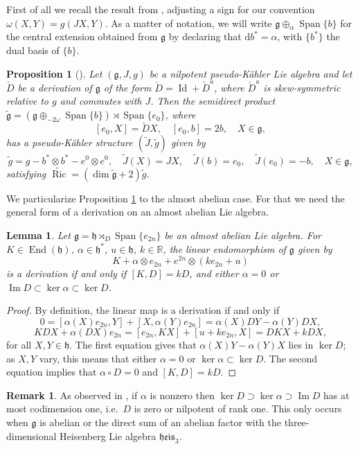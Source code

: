 \documentclass{article}
\newtheorem{proposition}[theorem]{Proposition}
\newtheorem{lemma}[theorem]{Lemma}
\theoremstyle{definition}
\newtheorem{remark}[theorem]{Remark}
\DeclareMathOperator{\Id}{Id}
\DeclareMathOperator{\End}{End}
\DeclareMathOperator{\Ric}{Ric}
\newcommand{\R}{\mathbb{R}}
\newcommand{\frg}{\mathfrak{g}}
\newcommand{\frh}{\mathfrak{h}}
\renewcommand{\Im}{\operatorname{Im}}
\renewcommand{\d}{\mathrm{d}}
\newcommand{\Span}[1]{\operatorname{Span}\{#1\}}
\newcommand{\lie}[1]{\mathfrak{#1}}
\DeclareMathOperator{\im}{Im}
\newcommand{\g}{\lie g}
\begin{document}
First of all we recall the result from \cite{Conti_Rossi_SegnanDalmasso_2023}, adjusting a sign for our convention $\omega(X,Y)=g(JX,Y)$. As a matter of notation, we will write $\g\oplus_{\alpha}\Span{b}$ for the central extension obtained from $\g$ by declaring that $\d b^*=\alpha$, with $\{b^*\}$ the dual basis of $\{b\}$.

\begin{proposition}[{\cite[Corollary 3.6]{Conti_Rossi_SegnanDalmasso_2023}}]\label{prop:constructse}
    Let $(\frg,J,g)$ be a nilpotent pseudo-Kähler Lie algebra and let $\check{D}$ be a derivation of $\frg$ of the form $\check{D}=\Id+\check{D}^a$, where $\check{D}^a$ is skew-symmetric relative to $g$ and commutes with $J$. Then the semidirect product $\tilde{\frg}=(\frg\oplus_{-2\omega}\Span{b})\rtimes\Span{e_0}$, where $$[e_0,X]=\check{D}X,\quad[e_0,b]=2b,\quad X\in\frg,$$ has a pseudo-Kähler structure $(\tilde{J},\tilde{g})$ given by $$\tilde{g}=g-b^*\otimes b^*-e^0\otimes e^0,\quad \tilde{J}(X)=JX,\quad \tilde{J}(b)=e_0,\quad \tilde{J}(e_0)=-b,\quad X\in\frg,$$ satisfying $\widetilde{\Ric}=(\dim\tilde{\g}+2)\tilde{g}$.
\end{proposition}

We particularize Proposition \ref{prop:constructse} to the almost abelian case. For that we need the general form of a derivation on an almost abelian Lie algebra.

\begin{lemma}\label{lemma:derivationsalmostabelian}
    Let $\frg=\frh\rtimes_D\Span{e_{2n}}$ be an almost abelian Lie algebra. For $K\in\End(\frh)$, $\alpha\in\frh^*$, $u\in\frh$, $k\in\R$, the linear endomorphism of $\frg$ given by $$K+\alpha\otimes e_{2n}+e^{2n}\otimes (ke_{2n}+u)$$ is a derivation if and only if $[K,D]=kD$, and either $\alpha=0$ or $\Im D\subset\ker\alpha\subset\ker D$.
\end{lemma}

\begin{proof}
    By definition, the linear map is a derivation if and only if $$0=[\alpha(X)e_{2n},Y]+[X,\alpha(Y)e_{2n}]=\alpha(X)DY-\alpha(Y)DX,$$
    $$KDX+\alpha(DX)e_{2n}=[e_{2n},KX]+[u+ke_{2n},X]=DKX+kDX,$$ for all $X,Y\in\frh$. The first equation gives that $\alpha(X)Y-\alpha(Y)X$ lies in $\ker D$; as $X,Y$ vary, this means that either $\alpha=0$ or $\ker\alpha\subset\ker D$. The second equation implies that $\alpha\circ D=0$ and $[K,D]=kD$.
\end{proof}

\begin{remark}
    As observed in \cite{Avetisyan_2022}, if $\alpha$ is nonzero then $\ker D\supset \ker\alpha\supset\im D$ has at most codimension one, i.e.\ $D$ is zero or nilpotent of rank one. This only occurs when $\g$ is abelian or the direct sum of an abelian factor with the three-dimensional Heisenberg Lie algebra $\mathfrak{heis}_3$.
\end{remark}
\end{document}
